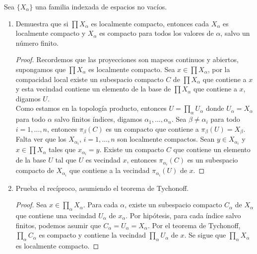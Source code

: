 
\item Sea $\{X_\alpha\}$ una familia indexada de espacios no vacíos.
    \begin{enumerate}
        \item Demuestra que si $\prod X_\alpha$ es localmente compacto, entonces cada $X_\alpha$ es localmente compacto y $X_\alpha$ es compacto para todos los valores de $\alpha$, salvo un número finito.

        \begin{proof}
            Recordemos que las proyecciones son mapeos continuos y abiertos, supongamos que $\prod X_\alpha$ es localmente compacto. Sea $x\in \prod X_\alpha$, por la compacidad local existe un subespacio compacto $C$ de $\prod X_\alpha$ que contiene a $x$ y esta vecindad contiene un elemento de la base de $\prod X_\alpha$ que contiene a $x$, digamos $U$.\\

            Como estamos en la topología producto, entonces $U=\prod_{\alpha}U_{\alpha}$ donde $U_{\alpha}=X_{\alpha}$ para todo $\alpha$ salvo finitos índices, digamos $\alpha_1,\ldots,\alpha_n$. Sea $\beta\neq \alpha_i$ para  todo $i=1,\ldots,n$, entonces $\pi_{\beta}(C)$ es un compacto que contiene a $\pi_{\beta}(U)=X_{\beta}$.\\

            Falta ver que los $X_{\alpha_i}$, $i=1,\ldots,n$ son localmente compactos. Sean $y\in X_{\alpha_i}$ y $x \in \prod X_\alpha$ tales que $x_{\alpha_i}=y$. Existe un compacto $C$ que contiene un elemento de la base $U$ tal que $U$ es vecindad $x$, entonces $\pi_{\alpha_i}(C)$ es un subespacio compacto de $X_{\alpha_i}$ que contiene a la vecindad $\pi_{\alpha_i}(U)$ de $x$.  
        \end{proof}

        \item Prueba el recíproco, asumiendo el teorema de Tychonoff.

        \begin{proof}
            Sea $x \in \prod_\alpha X_\alpha$. Para cada $\alpha$, existe un subespacio compacto $C_\alpha$ de $X_\alpha$ que contiene una vecindad $U_\alpha$ de $x_\alpha$. Por hipótesis, para cada índice salvo finitos, podemos asumir que $C_\alpha = U_\alpha = X_\alpha$. Por el teorema de Tychonoff, $\prod_\alpha C_\alpha$ es compacto y contiene la vecindad $\prod_\alpha U_\alpha$ de $x$. Se sigue que $\prod_\alpha X_\alpha$ es localmente compacto.
        \end{proof}
    \end{enumerate}